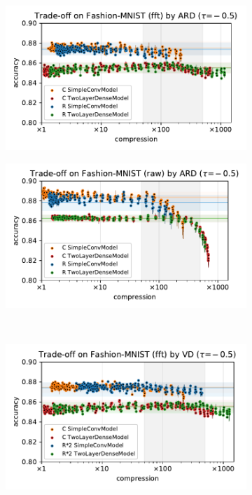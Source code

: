 \documentclass[a4paper,10pt,onecolumn]{article}
\begin{document}
\begin{figure}[b]
\begin{subfigure}[b]{0.5\columnwidth}
  \end{subfigure} \\%
  \begin{subfigure}[b]{0.5\columnwidth}
    \centering
    \includegraphics[width=\columnwidth]{figure__mnist-like__trade-off/appendix__ARD__fashionmnist__fft__-0.5.pdf}
  \end{subfigure}%
  \begin{subfigure}[b]{0.5\columnwidth}
    \centering
    \includegraphics[width=\columnwidth]{figure__mnist-like__trade-off/appendix__ARD__fashionmnist__raw__-0.5.pdf}
  \end{subfigure} \\%
  \begin{subfigure}[b]{0.5\columnwidth}
    \centering
    \includegraphics[width=\columnwidth]{figure__mnist-like__trade-off/appendix__cmp__VD__fashionmnist__fft__-0.5.pdf}

\end{subfigure}
\end{figure}
\end{document}
